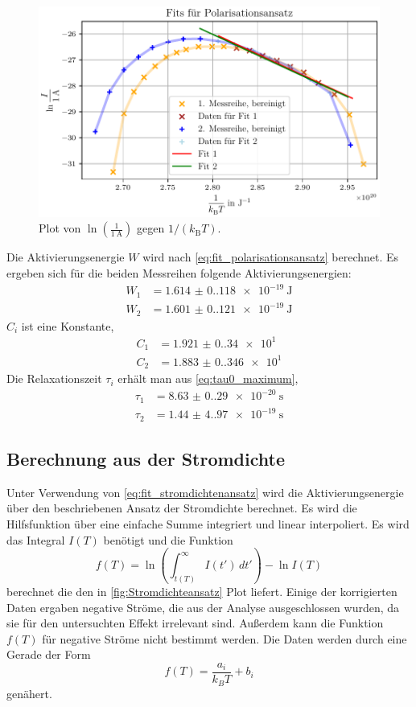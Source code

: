 \begin{figure}[H]
    \centering
    \includegraphics[width=\textwidth]{plots/G_polarisationsansatz.pdf}
    \caption{Plot von $\ln\left(\frac{1}{\qty{1}{\ampere}}\right)$ gegen $1/(k_\text{B}T)$.}
    \label{fig:Polarisationsansatz}
\end{figure}

Die Aktivierungsenergie $W$ wird nach \autoref{eq:fit_polarisationsansatz} berechnet.
Es ergeben sich für die beiden Messreihen folgende Aktivierungsenergien:
\begin{align*}
W_1 &= \qty{1.614(0.118)e-19}{\joule}\\
W_2 &= \qty{1.601(0.121)e-19}{\joule}
\end{align*}
$C_i$ ist eine Konstante,
\begin{align*}
C_1 &= \num{1.921(0.340)e1}\\
C_2 &= \num{1.883(0.346)e1}
\end{align*}
Die Relaxationszeit $\tau_i$ erhält man aus \autoref{eq:tau0_maximum},
\begin{align*}
\tau_1 &= \qty{8.63(0.29)e-20}{\second}\\
\tau_2 &= \qty{1.44(4.97)e-19}{\second}
\end{align*}

\subsection{Berechnung aus der Stromdichte}
Unter Verwendung von \autoref{eq:fit_stromdichtenansatz} wird die Aktivierungsenergie über den beschriebenen Ansatz der Stromdichte 
berechnet. Es wird die Hilfsfunktion über eine einfache Summe integriert und linear interpoliert.
Es wird das Integral $I(T)$ benötigt und die Funktion 
\begin{equation}
f(T) = \ln \left( \int_{t(T)}^{\infty} I(t') \, dt' \right) - \ln I(T)
\end{equation}
berechnet die den in \ref{fig:Stromdichteansatz} Plot liefert. Einige der korrigierten Daten ergaben negative Ströme,
die aus der Analyse ausgeschlossen wurden, da sie für den untersuchten Effekt irrelevant sind.
Außerdem kann die Funktion $f(T)$ für negative Ströme nicht bestimmt werden. Die Daten werden durch eine Gerade der Form 
\begin{equation}
    f(T)=\frac{a_i}{k_BT}+b_i
\end{equation}
genähert.


